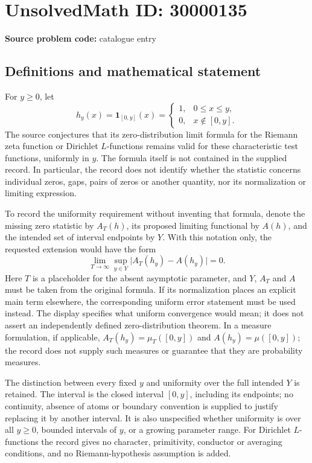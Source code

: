\documentclass[11pt]{article}
\begin{document}
\section*{UnsolvedMath ID: 30000135}
\textbf{Source problem code:} catalogue entry
\subsection{Definitions and mathematical statement}
For \(y\geq0\), let
\[
 h_y(x)=\mathbf1_{[0,y]}(x)=
 \begin{cases}1,&0\leq x\leq y,\\0,&x\notin[0,y].\end{cases}
\]
The source conjectures that its zero-distribution limit formula for the Riemann zeta function or Dirichlet \(L\)-functions remains valid for these characteristic test functions, uniformly in \(y\). The formula itself is not contained in the supplied record. In particular, the record does not identify whether the statistic concerns individual zeros, gaps, pairs of zeros or another quantity, nor its normalization or limiting expression.

To record the uniformity requirement without inventing that formula, denote the missing zero statistic by \(A_T(h)\), its proposed limiting functional by \(A(h)\), and the intended set of interval endpoints by \(Y\). With this notation only, the requested extension would have the form
\[
 \lim_{T\to\infty}\sup_{y\in Y}
 \bigl|A_T(h_y)-A(h_y)\bigr|=0.
\]
Here \(T\) is a placeholder for the absent asymptotic parameter, and \(Y\), \(A_T\) and \(A\) must be taken from the original formula. If its normalization places an explicit main term elsewhere, the corresponding uniform error statement must be used instead. The display specifies what uniform convergence would mean; it does not assert an independently defined zero-distribution theorem. In a measure formulation, if applicable, \(A_T(h_y)=\mu_T([0,y])\) and \(A(h_y)=\mu([0,y])\); the record does not supply such measures or guarantee that they are probability measures.

The distinction between every fixed \(y\) and uniformity over the full intended \(Y\) is retained. The interval is the closed interval \([0,y]\), including its endpoints; no continuity, absence of atoms or boundary convention is supplied to justify replacing it by another interval. It is also unspecified whether uniformity is over all \(y\geq0\), bounded intervals of \(y\), or a growing parameter range. For Dirichlet \(L\)-functions the record gives no character, primitivity, conductor or averaging conditions, and no Riemann-hypothesis assumption is added.
\end{document}
